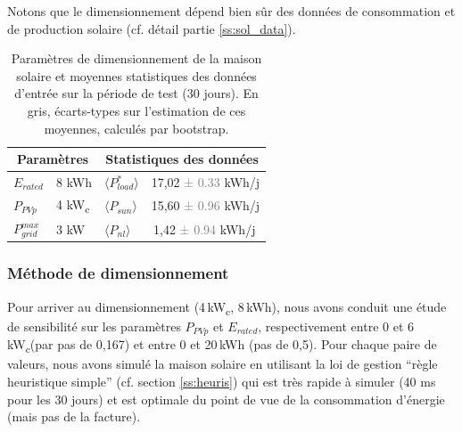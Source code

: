 \documentclass[a4paper,10pt,twocolumn]{article}
\providecommand{\avg}[1]{\langle#1\rangle}
\newcommand\sub[1]{\textsubscript{#1}}
\newcommand\kWc{kW\sub{c}{}} %
\providecommand{\deta}[1]{\textcolor{gray}{#1}}
\begin{document}
Notons que le dimensionnement dépend bien sûr des données
de consommation et de production solaire (cf. détail partie \ref{ss:sol_data}).

\begin{table}[!h]
\renewcommand{\arraystretch}{1.2}

\caption{Paramètres de dimensionnement de la maison solaire
et moyennes statistiques des données d'entrée sur la période de test
(30 jours).
En gris, écarts-types sur l'estimation de ces moyennes,
calculés par bootstrap.}
\label{tab:dim_stats}

\noindent
\centering
  \begin{center}
    \begin{tabular}{l l l l}
      \toprule
      \multicolumn{2}{c}{Paramètres} & \multicolumn{2}{c}{Statistiques des données} \\
      \midrule
      $E_{rated}$       & 8 kWh  & $\avg{P_{load}^*}$ &    17,02 \deta{± 0.33} kWh/j\\
      $P_{PVp}$         & 4 \kWc  & $\avg{P_{sun}}$    &    15,60 \deta{± 0.96} kWh/j\\
      $P_{grid}^{max}$  & 3 kW   & $\avg{P_{nl}}$     & \;\,1,42 \deta{± 0.94} kWh/j\\
      \bottomrule
    \end{tabular}
  \end{center}
\end{table}

\subsubsection{Méthode de dimensionnement}

Pour arriver au dimensionnement (4\,\kWc, 8\,kWh), nous avons conduit une étude
de sensibilité sur les paramètres $P_{PVp}$ et $E_{rated}$, respectivement
entre 0 et 6\,\kWc (par pas de 0,167) et entre 0 et 20\,kWh (pas de 0,5).
Pour chaque paire de valeurs, nous avons simulé la maison solaire
en utilisant la loi de gestion ``règle heuristique simple'' (cf. section \ref{ss:heuris})
qui est très rapide à simuler (40 ms pour les 30 jours) et est optimale
du point de vue de la consommation d'énergie (mais pas de la facture).
\end{document}
